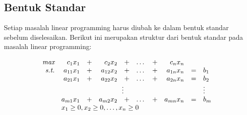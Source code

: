 			

\subsection{Bentuk Standar}
Setiap masalah linear programming harus diubah ke dalam bentuk standar sebelum diselesaikan. Berikut ini merupakan struktur dari bentuk standar pada masalah linear programming:
    	
\begin{equation*}
	\begin{array}{r r c r c r c r c l}
	    \textit{max}		& c_1x_1    & + & c_2x_2 	& + & \dots & + & c_nx_n \\
		\textit{s.t.} 	& a_{11}x_1 & + & a_{12}x_2 & + & \dots & + & a_{1n}x_n & = & b_1 \\
    						& a_{21}x_1 & + & a_{22}x_2 & + & \dots & + & a_{2n}x_n & = & b_2 \\
                            & \multicolumn{7}{c}{\vdots}                            &   & \vdots \\
                            & a_{m1}x_1 & + & a_{m2}x_2 & + & \dots & + & a_{mn}x_n & = & b_m \\
                            & \multicolumn{9}{l}{x_1\geq0,x_2\geq0,\dots,x_n\geq0}
	\end{array}
\end{equation*}

